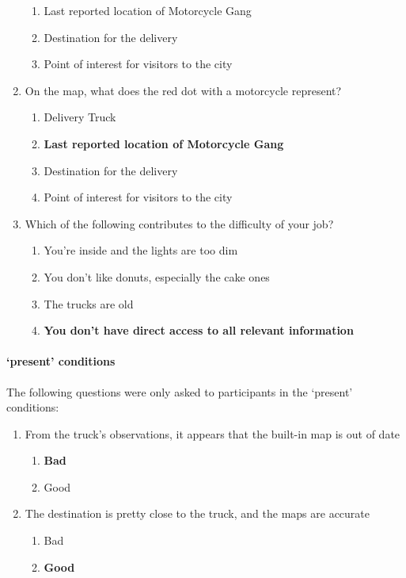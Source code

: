 \begin{quoting}
\begin{enumerate}
\begin{enumerate}[label=(\alph*)]
        \item Last reported location of Motorcycle Gang
        \item Destination for the delivery
        \item Point of interest for visitors to the city
    \end{enumerate}
    \item On the map, what does the red dot with a motorcycle represent?
    \begin{enumerate}[label=(\alph*)]
        \item Delivery Truck
        \item \textbf{Last reported location of Motorcycle Gang}
        \item Destination for the delivery
        \item Point of interest for visitors to the city
    \end{enumerate}
    \item Which of the following contributes to the difficulty of your job?
    \begin{enumerate}[label=(\alph*)]
        \item You're inside and the lights are too dim
        \item You don't like donuts, especially the cake ones
        \item The trucks are old
        \item \textbf{You don't have direct access to all relevant information}
    \end{enumerate}
\end{enumerate}
\end{quoting}

\paragraph{\xQ{} `present' conditions} The following questions were only asked to participants in the \xQ{} `present' conditions:
\begin{quoting}
\begin{enumerate}
    \item From the truck’s observations, it appears that the built-in map is out of date
    \begin{enumerate}[label=(\alph*)]
        \item \textbf{Bad}
        \item Good
    \end{enumerate}
    \item The destination is pretty close to the truck, and the maps are accurate
    \begin{enumerate}[label=(\alph*)]
        \item Bad
        \item \textbf{Good}
    \end{enumerate}
\end{enumerate}
\end{quoting}

